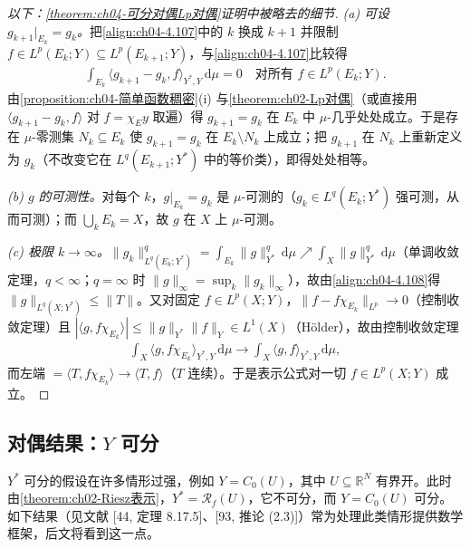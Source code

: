 \documentclass[../../main.tex]{subfiles}%
\begin{document}
\begin{proof}[以下：\cref{theorem:ch04-可分对偶Lp对偶}证明中被略去的细节]
\emph{(a) 可设 $g_{k+1}|_{E_k}=g_k$。}把\eqref{align:ch04-4.107}中的 $k$ 换成 $k+1$ 并限制 $f\in L^p(E_k;Y)\subseteq L^p(E_{k+1};Y)$，与\eqref{align:ch04-4.107}比较得
\begin{align*}
\int_{E_k}\langle g_{k+1}-g_k,f\rangle_{Y^*,Y}\,\mathrm{d}\mu=0\quad\text{对所有 }f\in L^p(E_k;Y).
\end{align*}
由\cref{proposition:ch04-简单函数稠密}(i) 与\cref{theorem:ch02-Lp对偶}（或直接用 $\langle g_{k+1}-g_k,f\rangle$ 对 $f=\chi_Ey$ 取遍）得 $g_{k+1}=g_k$ 在 $E_k$ 中 $\mu$-几乎处处成立。于是存在 $\mu$-零测集 $N_k\subseteq E_k$ 使 $g_{k+1}=g_k$ 在 $E_k\setminus N_k$ 上成立；把 $g_{k+1}$ 在 $N_k$ 上重新定义为 $g_k$（不改变它在 $L^q(E_{k+1};Y^*)$ 中的等价类），即得处处相等。

\emph{(b) $g$ 的可测性。}对每个 $k$，$g|_{E_k}=g_k$ 是 $\mu$-可测的（$g_k\in L^q(E_k;Y^*)$ 强可测，从而可测）；而 $\bigcup_kE_k=X$，故 $g$ 在 $X$ 上 $\mu$-可测。

\emph{(c) 极限 $k\to\infty$。}$\|g_k\|_{L^q(E_k;Y^*)}^q=\int_{E_k}\|g\|_{Y^*}^q\,\mathrm{d}\mu\nearrow\int_X\|g\|_{Y^*}^q\,\mathrm{d}\mu$（单调收敛定理，$q<\infty$；$q=\infty$ 时 $\|g\|_\infty=\sup_k\|g_k\|_\infty$），故由\eqref{align:ch04-4.108}得 $\|g\|_{L^q(X;Y^*)}\leqslant\|T\|$。又对固定 $f\in L^p(X;Y)$，$\|f-f\chi_{E_k}\|_{L^p}\to0$（控制收敛定理）且 $|\langle g,f\chi_{E_k}\rangle|\leqslant\|g\|_{Y^*}\|f\|_Y\in L^1(X)$（Hölder），故由控制收敛定理
\begin{align*}
\int_X\langle g,f\chi_{E_k}\rangle_{Y^*,Y}\,\mathrm{d}\mu\longrightarrow\int_X\langle g,f\rangle_{Y^*,Y}\,\mathrm{d}\mu,
\end{align*}
而左端 $=\langle T,f\chi_{E_k}\rangle\to\langle T,f\rangle$（$T$ 连续）。于是表示公式对一切 $f\in L^p(X;Y)$ 成立。
\end{proof}

\subsection{对偶结果：$Y$ 可分}\label{subsection:ch04-可分Y对偶}

$Y^*$ 可分的假设在许多情形过强，例如 $Y=C_0(U)$，其中 $U\subseteq\mathbb{R}^N$ 有界开。此时由\cref{theorem:ch02-Riesz表示}，$Y^*=\mathscr{R}_f(U)$，它不可分，而 $Y=C_0(U)$ 可分。如下结果（见文献 [44, 定理 8.17.5]、[93, 推论 (2.3)]）常为处理此类情形提供数学框架，后文将看到这一点。
\end{document}

